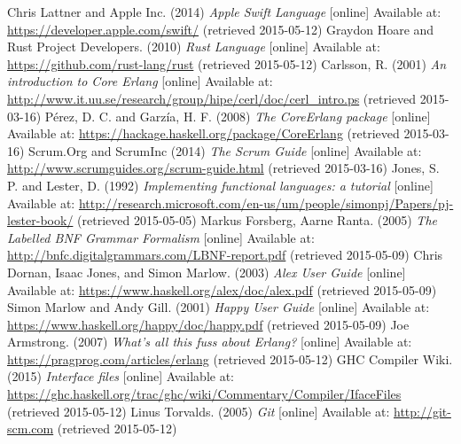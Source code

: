 \begin{thebibliography}{69}
 Chris Lattner and Apple Inc. (2014) \textit{Apple Swift Language} [online] Available at: \url{https://developer.apple.com/swift/} (retrieved 2015-05-12)
 Graydon Hoare and Rust Project Developers. (2010) \textit{Rust Language} [online] Available at: \url{https://github.com/rust-lang/rust} (retrieved 2015-05-12)
 Carlsson, R. (2001) \textit{An introduction to Core Erlang} [online] Available at: \url{http://www.it.uu.se/research/group/hipe/cerl/doc/cerl_intro.ps} (retrieved 2015-03-16)
 Pérez, D. C. and Garzía, H. F. (2008) \textit{The CoreErlang package} [online] Available at: \url{https://hackage.haskell.org/package/CoreErlang} (retrieved 2015-03-16)
 Scrum.Org and ScrumInc (2014) \textit{The Scrum Guide} [online] Available at: \url{http://www.scrumguides.org/scrum-guide.html} (retrieved 2015-03-16)
 Jones, S. P. and Lester, D. (1992) \textit{Implementing functional languages: a tutorial} [online] Available at: \url{http://research.microsoft.com/en-us/um/people/simonpj/Papers/pj-lester-book/} (retrieved 2015-05-05)
 Markus Forsberg, Aarne Ranta. (2005) \textit{The Labelled BNF Grammar Formalism} [online] Available at: \url{http://bnfc.digitalgrammars.com/LBNF-report.pdf} (retrieved 2015-05-09)
 Chris Dornan, Isaac Jones, and Simon Marlow. (2003) \textit{Alex User Guide} [online] Available at: \url{https://www.haskell.org/alex/doc/alex.pdf} (retrieved 2015-05-09)
 Simon Marlow and Andy Gill. (2001) \textit{Happy User Guide} [online] Available at: \url{https://www.haskell.org/happy/doc/happy.pdf} (retrieved 2015-05-09)
 Joe Armstrong. (2007) \textit{What's all this fuss about Erlang?} [online] Available at: \url{https://pragprog.com/articles/erlang} (retrieved 2015-05-12)
  GHC Compiler Wiki. (2015) \textit{Interface files} [online] Available at: \url{https://ghc.haskell.org/trac/ghc/wiki/Commentary/Compiler/IfaceFiles} (retrieved 2015-05-12)
  Linus Torvalds. (2005) \textit{Git} [online] Available at: \url{http://git-scm.com} (retrieved 2015-05-12)


\end{thebibliography}

